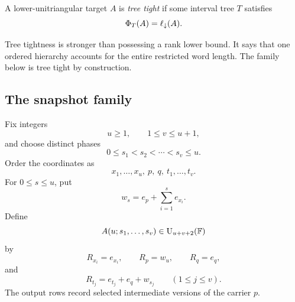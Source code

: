 \begin{definition}\label{def:tree-tight}
A lower-unitriangular target $A$ is \emph{tree tight} if some interval tree $T$ satisfies
\[
\Phi_T(A)=\ell_{\downarrow}(A).
\]
\end{definition}

Tree tightness is stronger than possessing a rank lower bound.  It says that one ordered hierarchy accounts for the entire restricted word length.  The family below is tree tight by construction.

\subsection{The snapshot family}

Fix integers
\[
u\ge1,
\qquad
1\le v\le u+1,
\]
and choose distinct phases
\[
0\le s_1<s_2<\cdots<s_v\le u.
\]
Order the coordinates as
\[
x_1,\ldots,x_u,\ p,\ q,\ t_1,\ldots,t_v.
\]
For $0\le s\le u$, put
\begin{equation}\label{eq:prefix-state}
w_s=e_p+\sum_{i=1}^{s}e_{x_i}.
\end{equation}
Define
\begin{equation}\label{eq:snapshot-target}
A(u;s_1,\ldots,s_v)\in\operatorname{U}_{u+v+2}(\mathbb F)
\end{equation}
by
\[
R_{x_i}=e_{x_i},
\qquad
R_p=w_u,
\qquad
R_q=e_q,
\]
and
\begin{equation}\label{eq:snapshot-output}
R_{t_j}=e_{t_j}+e_q+w_{s_j}
\qquad(1\le j\le v).
\end{equation}
The output rows record selected intermediate versions of the carrier $p$.

